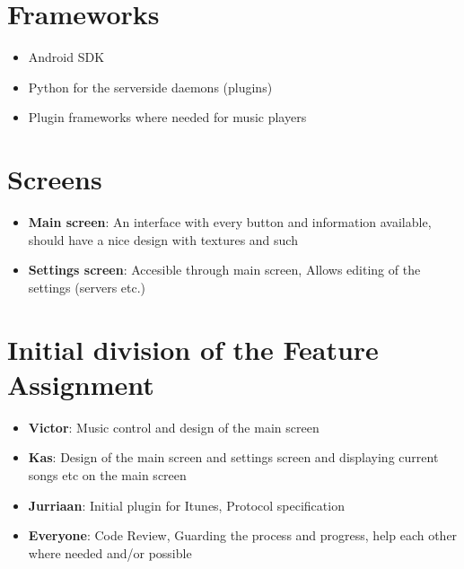 \documentclass[a4paper, 13pt]{article}
\begin{document}
\section*{Frameworks}
    \begin{itemize}
     \item Android SDK
     \item Python for the serverside daemons (plugins)
     \item Plugin frameworks where needed for music players
    \end{itemize}

\section*{Screens}
    \begin{itemize}
     \item \textbf{Main screen}: An interface with every button and information
     available, should have a nice design with textures and such
     \item \textbf{Settings screen}: Accesible through main screen, Allows
     editing of the settings (servers etc.)
    \end{itemize}
    
\section*{Initial division of the Feature Assignment}
    \begin{itemize}
     \item \textbf{Victor}: Music control and design of the main screen
     \item \textbf{Kas}: Design of the main screen and settings screen and
     displaying current songs etc on the main screen
     \item \textbf{Jurriaan}: Initial plugin for Itunes, Protocol specification

     \item \textbf{Everyone}: Code Review, Guarding the process and progress,
     help each other where needed and/or possible
    \end{itemize}
\end{document}
